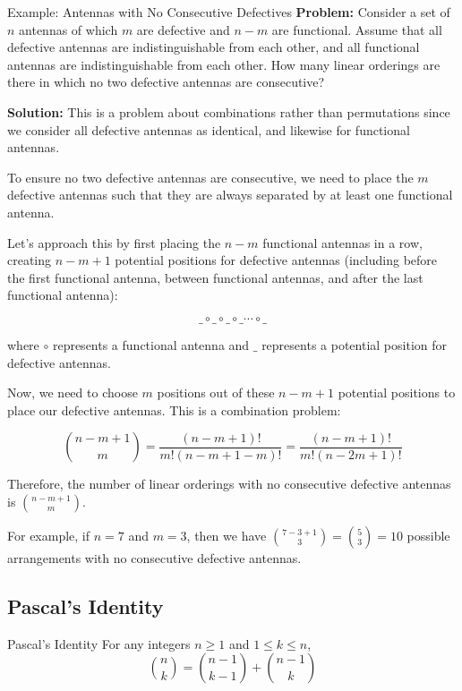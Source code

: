 \begin{exampleboxbreak}{Example: Antennas with No Consecutive Defectives}
    \textbf{Problem:} Consider a set of $n$ antennas of which $m$ are defective and $n-m$ are functional. Assume that all defective antennas are indistinguishable from each other, and all functional antennas are indistinguishable from each other. How many linear orderings are there in which no two defective antennas are consecutive?

    \textbf{Solution:} This is a problem about combinations rather than permutations since we consider all defective antennas as identical, and likewise for functional antennas.

    To ensure no two defective antennas are consecutive, we need to place the $m$ defective antennas such that they are always separated by at least one functional antenna.

    Let's approach this by first placing the $n-m$ functional antennas in a row, creating $n-m+1$ potential positions for defective antennas (including before the first functional antenna, between functional antennas, and after the last functional antenna):

    \[
    \_ \circ \_ \circ \_ \circ \_ \cdots \circ \_
    \]

    where $\circ$ represents a functional antenna and $\_$ represents a potential position for defective antennas.

    Now, we need to choose $m$ positions out of these $n-m+1$ potential positions to place our defective antennas. This is a combination problem:

    \[
    \binom{n-m+1}{m} = \frac{(n-m+1)!}{m!(n-m+1-m)!} = \frac{(n-m+1)!}{m!(n-2m+1)!}
    \]

    Therefore, the number of linear orderings with no consecutive defective antennas is $\binom{n-m+1}{m}$.

    For example, if $n=7$ and $m=3$, then we have $\binom{7-3+1}{3} = \binom{5}{3} = 10$ possible arrangements with no consecutive defective antennas.
\end{exampleboxbreak}

\subsection{Pascal's Identity}
\begin{theoremboxbreak}{Pascal's Identity}
    For any integers \(n \geq 1\) and \(1 \leq k \leq n\),
    \[
    \binom{n}{k} = \binom{n-1}{k-1} + \binom{n-1}{k}
    \]
\end{theoremboxbreak}
